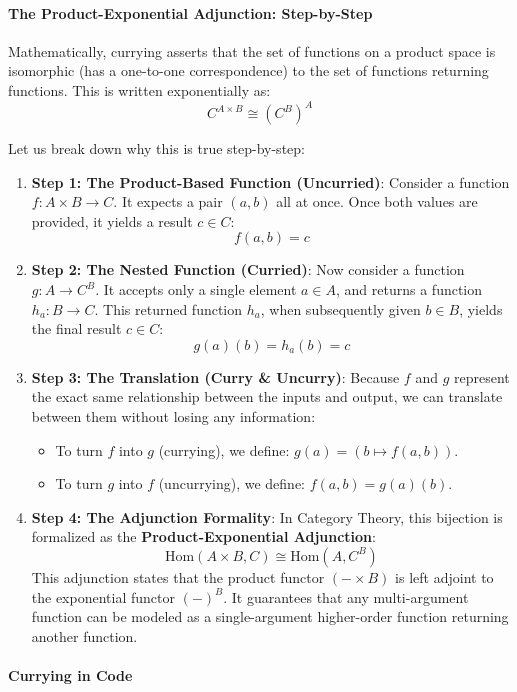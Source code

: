 \paragraph{The Product-Exponential Adjunction: Step-by-Step}

Mathematically, currying asserts that the set of functions on a product space is isomorphic (has a one-to-one correspondence) to the set of functions returning functions. This is written exponentially as:
\[ C^{A \times B} \cong (C^B)^A \]

Let us break down why this is true step-by-step:
\begin{enumerate}
    \item \textbf{Step 1: The Product-Based Function (Uncurried)}:
    Consider a function $f : A \times B \to C$. It expects a pair $(a, b)$ all at once. Once both values are provided, it yields a result $c \in C$:
    \[ f(a, b) = c \]
    \item \textbf{Step 2: The Nested Function (Curried)}:
    Now consider a function $g : A \to C^B$. It accepts only a single element $a \in A$, and returns a function $h_a : B \to C$. This returned function $h_a$, when subsequently given $b \in B$, yields the final result $c \in C$:
    \[ g(a)(b) = h_a(b) = c \]
    \item \textbf{Step 3: The Translation (Curry \& Uncurry)}:
    Because $f$ and $g$ represent the exact same relationship between the inputs and output, we can translate between them without losing any information:
    \begin{itemize}
        \item To turn $f$ into $g$ (currying), we define: $g(a) = (b \mapsto f(a, b))$.
        \item To turn $g$ into $f$ (uncurrying), we define: $f(a, b) = g(a)(b)$.
    \end{itemize}
    \item \textbf{Step 4: The Adjunction Formality}:
    In Category Theory, this bijection is formalized as the \textbf{Product-Exponential Adjunction}:
    \[ \text{Hom}(A \times B, C) \cong \text{Hom}(A, C^B) \]
    This adjunction states that the product functor $(-\times B)$ is left adjoint to the exponential functor $(-)^B$. It guarantees that any multi-argument function can be modeled as a single-argument higher-order function returning another function.
\end{enumerate}

\paragraph{Currying in Code}


